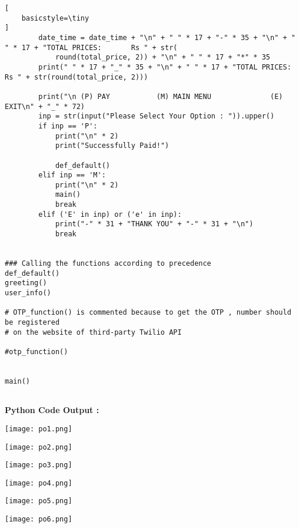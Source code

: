 \documentclass[11pt, a4paper]{article}
\begin{document}
\begin{lstlisting}[
    basicstyle=\tiny
]
        date_time = date_time + "\n" + " " * 17 + "-" * 35 + "\n" + " " * 17 + "TOTAL PRICES:       Rs " + str(
            round(total_price, 2)) + "\n" + " " * 17 + "*" * 35
        print(" " * 17 + "_" * 35 + "\n" + " " * 17 + "TOTAL PRICES:       Rs " + str(round(total_price, 2)))

        print("\n (P) PAY           (M) MAIN MENU              (E) EXIT\n" + "_" * 72)
        inp = str(input("Please Select Your Option : ")).upper()
        if inp == 'P':
            print("\n" * 2)
            print("Successfully Paid!")

            def_default()
        elif inp == 'M':
            print("\n" * 2)
            main()
            break
        elif ('E' in inp) or ('e' in inp):
            print("-" * 31 + "THANK YOU" + "-" * 31 + "\n")
            break


### Calling the functions according to precedence
def_default()
greeting()
user_info()

# OTP_function() is commented because to get the OTP , number should be registered
# on the website of third-party Twilio API

#otp_function()


main()


\end{lstlisting}

\newpage
\textbf{ Python Code Output :}

\vspace{0.8cm}

\begin{center}
    \texttt{[image: po1.png]}
\end{center}

\newpage
\vspace{0.8cm}

\begin{center}
    \texttt{[image: po2.png]}
    
\end{center}
\newpage
\vspace{0.8cm}

\begin{center}
    \texttt{[image: po3.png]}
\end{center}
\newpage
\vspace{0.8cm}

\begin{center}
    \texttt{[image: po4.png]}
\end{center}
\newpage
\vspace{0.8cm}

\begin{center}
    \texttt{[image: po5.png]}
\end{center}

\vspace{0.8cm}
\begin{center}
    \texttt{[image: po6.png]}
\end{center}
\end{document}
